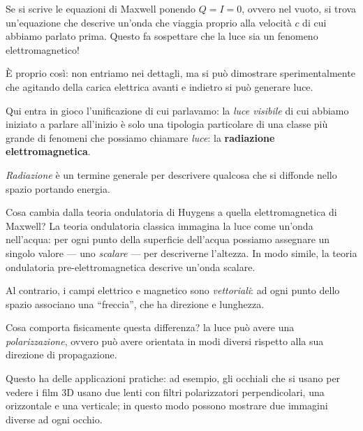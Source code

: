 \documentclass[a4paper,12pt]{article}
\begin{document}
Se si scrive le equazioni di Maxwell ponendo \(Q = I = 0\), ovvero nel vuoto, si trova un'equazione che descrive un'onda che viaggia proprio alla velocità \(c\) di cui abbiamo parlato prima. 
Questo fa sospettare che la luce sia un fenomeno elettromagnetico! 

È proprio così: non entriamo nei dettagli, ma si può dimostrare sperimentalmente che agitando della carica elettrica avanti e indietro si può generare luce.

Qui entra in gioco l'unificazione di cui parlavamo: la \emph{luce visibile} di cui abbiamo iniziato a parlare all'inizio è solo una tipologia particolare di una classe più grande di fenomeni che possiamo chiamare \emph{luce}: la \textbf{radiazione elettromagnetica}.

\emph{Radiazione} è un termine generale per descrivere qualcosa che si diffonde nello spazio portando energia.

Cosa cambia dalla teoria ondulatoria di Huygens a quella elettromagnetica di Maxwell?
La teoria ondulatoria classica immagina la luce come un'onda nell'acqua: per ogni punto della superficie dell'acqua possiamo assegnare un singolo valore --- uno \emph{scalare} --- per descriverne l'altezza.
In modo simile, la teoria ondulatoria pre-elettromagnetica descrive un'onda scalare.

Al contrario, i campi elettrico e magnetico sono \emph{vettoriali}: ad ogni punto dello spazio associano una ``freccia'', che ha direzione e lunghezza.

Cosa comporta fisicamente questa differenza? la luce può avere una \emph{polarizzazione}, ovvero può avere orientata in modi diversi rispetto alla sua direzione di propagazione. 



Questo ha delle applicazioni pratiche: ad esempio, gli occhiali che si usano per vedere i film 3D usano due lenti con filtri polarizzatori perpendicolari, una orizzontale e una verticale; in questo modo possono mostrare due immagini diverse ad ogni occhio.
\end{document}
